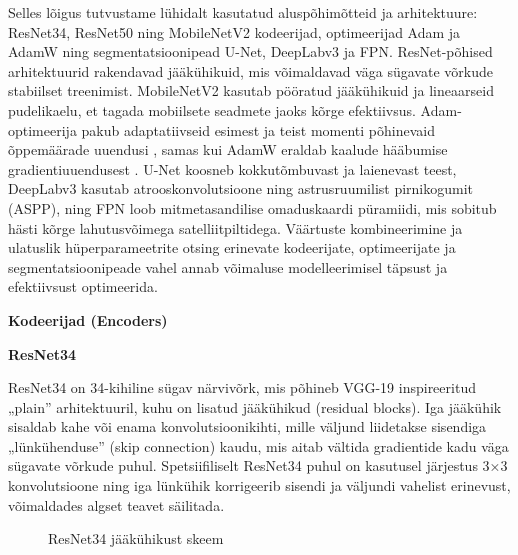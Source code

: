 Selles lõigus tutvustame lühidalt kasutatud aluspõhimõtteid ja arhitektuure:
ResNet34, ResNet50 ning MobileNetV2 kodeerijad, optimeerijad Adam ja AdamW ning
segmentatsioonipead U-Net, DeepLabv3 ja FPN\@. ResNet-põhised arhitektuurid
rakendavad jääkühikuid, mis võimaldavad väga sügavate võrkude stabiilset
treenimist. MobileNetV2 kasutab pööratud jääkühikuid ja lineaarseid pudelikaelu,
et tagada mobiilsete seadmete jaoks kõrge efektiivsus. Adam-optimeerija pakub
adaptatiivseid esimest ja teist momenti põhinevaid õppemäärade uuendusi , samas
kui AdamW eraldab kaalude hääbumise gradientiuuendusest . U-Net koosneb
kokkutõmbuvast ja laienevast teest, DeepLabv3 kasutab atrooskonvolutsioone ning
astrusruumilist pirnikogumit (ASPP), ning FPN loob mitmetasandilise omaduskaardi
püramiidi, mis sobitub hästi kõrge lahutusvõimega satelliitpiltidega. Väärtuste
kombineerimine ja ulatuslik hüperparameetrite otsing erinevate kodeerijate,
optimeerijate ja segmentatsioonipeade vahel annab võimaluse modelleerimisel
täpsust ja efektiivsust optimeerida.

\textbf{Kodeerijad (Encoders)}

\textbf{ResNet34}

ResNet34 on 34-kihiline sügav närvivõrk, mis põhineb VGG-19 inspireeritud „plain” arhitektuuril, kuhu on lisatud jääkühikud (residual blocks). Iga jääkühik sisaldab kahe või enama konvolutsioonikihti, mille väljund liidetakse sisendiga „lünkühenduse” (skip connection) kaudu, mis aitab vältida gradientide kadu väga sügavate võrkude puhul. Spetsiifiliselt ResNet34 puhul on kasutusel järjestus 3×3 konvolutsioone ning iga lünkühik korrigeerib sisendi ja väljundi vahelist erinevust, võimaldades algset teavet säilitada.


\begin{figure}[H]
    \centering

    \caption{ResNet34 jääkühikust skeem}
    \label{fig:ResNet34jääkühikust}
\end{figure}

